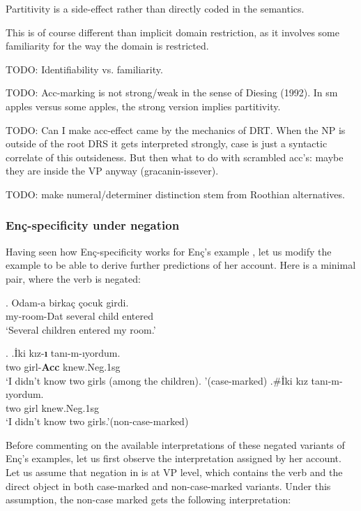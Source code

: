 \documentclass[11pt,a4paper]{article}
\newcommand{\encspec}{Enç-specific}
\begin{document}
Partitivity is a side-effect rather than directly coded in the
semantics.

This is of course different than implicit domain restriction, as it
involves some familiarity for the way the domain is restricted.

TODO: Identifiability vs. familiarity.

TODO: Acc-marking is not strong/weak in the sense of Diesing (1992). In sm
apples versus some apples, the strong version implies partitivity.


TODO: Can I make acc-effect came by the mechanics of DRT. When the NP is
outside of the root DRS it gets interpreted strongly, case is just a
syntactic correlate of this outsideness. But then what to do with
scrambled acc's: maybe they are inside the VP anyway
(gracanin-issever).

TODO: make numeral/determiner distinction stem from Roothian
alternatives.

\subsubsection{\encspec ity under negation}

Having seen how \encspec ity works for Enç's example , let us modify the example to be able to derive further predictions of her account. Here is a minimal pair, where the verb  is negated:

\exg.\label{Exenc16neg}%
{Odam-a}  {birka\c{c}} {\c{c}ocuk} {girdi.}\\
{my-room-Dat} {several}  {child}  {entered}\\
`Several children entered my room.'

\ex.\label{Exenc17neg}
\ag.\label{Exencnegacc}{\.Iki}  {k\i{}z-\textbf{\i}} {tan\i{}-m-ıyordum}.\\
{two}  {girl-{\bf Acc}}  {knew.Neg.1sg}\\
`I didn't know two girls (among the children). '\hfill (case-marked)
\bg.\label{Exencnegzero}\#{\.Iki}  {k\i{}z}  {tan\i{}-m-ıyordum.} \\
{two}  {girl}  {knew.Neg.1sg}\\
`I didn't know two girls.'\hfill (non-case-marked)

Before commenting on the available interpretations of these negated variants of Enç's examples, let us first observe the interpretation assigned by her account. Let us assume that negation in  is at VP level, which contains the verb and the direct object in both case-marked and non-case-marked variants. Under this assumption, the non-case marked  gets the following interpretation:
\end{document}
